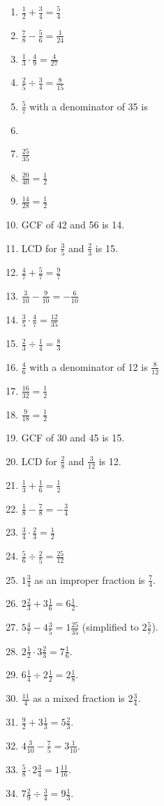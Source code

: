 \documentclass[14pt]{article}
\begin{document}
\begin{enumerate}
\item $\frac{1}{2} + \frac{3}{4} = \frac{5}{4}$
\item $\frac{7}{8} - \frac{5}{6} = \frac{1}{24}$
\item $\frac{1}{3} \cdot \frac{4}{9} = \frac{4}{27}$
\item $\frac{2}{5} \div \frac{3}{4} = \frac{8}{15}$
\item $\frac{5}{7}$ with a denominator of 35 is \item \item $\frac{25}{35}$
\item $\frac{20}{40} = \frac{1}{2}$
\item $\frac{14}{28} = \frac{1}{2}$
\item GCF of 42 and 56 is 14.
\item LCD for $\frac{3}{5}$ and $\frac{2}{3}$ is 15.
\item $\frac{4}{7} + \frac{5}{7} = \frac{9}{7}$
\item $\frac{3}{10} - \frac{9}{10} = -\frac{6}{10}$
\item $\frac{3}{5} \cdot \frac{4}{7} = \frac{12}{35}$
\item $\frac{2}{3} \div \frac{1}{4} = \frac{8}{3}$
\item $\frac{4}{6}$ with a denominator of 12 is $\frac{8}{12}$
\item $\frac{16}{32} = \frac{1}{2}$
\item $\frac{9}{18} = \frac{1}{2}$
\item GCF of 30 and 45 is 15.
\item LCD for $\frac{2}{8}$ and $\frac{3}{12}$ is 12.
\item $\frac{1}{3} + \frac{1}{6} = \frac{1}{2}$
\item $\frac{1}{8} - \frac{7}{8} = -\frac{3}{4}$
\item $\frac{3}{4} \cdot \frac{2}{3} = \frac{1}{2}$
\item $\frac{5}{6} \div \frac{2}{5} = \frac{25}{12}$
\item $1\frac{3}{4}$ as an improper fraction is $\frac{7}{4}$.
\item $2\frac{2}{3} + 3\frac{1}{6} = 6\frac{1}{2}$.
\item $5\frac{4}{7} - 4\frac{3}{5} = 1\frac{25}{35}$ (simplified to $2\frac{5}{7}$).
\item $2\frac{1}{2} \cdot 3\frac{2}{3} = 7\frac{1}{6}$.
\item $6\frac{1}{4} \div 2\frac{1}{2} = 2\frac{1}{8}$.
\item $\frac{11}{4}$ as a mixed fraction is $2\frac{3}{4}$.
\item $\frac{9}{2} + 3\frac{1}{3} = 5\frac{2}{3}$.
\item $4\frac{3}{10} - \frac{7}{5} = 3\frac{1}{10}$.
\item $\frac{5}{8} \cdot 2\frac{3}{4} = 1\frac{11}{16}$.
\item $7\frac{2}{9} \div \frac{3}{4} = 9\frac{1}{3}$.
\end{enumerate}
\end{document}
